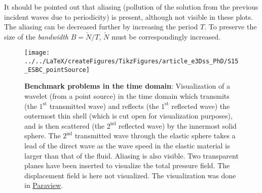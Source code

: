 It should be pointed out that aliasing (pollution of the solution from the previous incident waves due to periodicity) is present, although not visible in these plots. The aliasing can be decreased further by increasing the period $T$. To preserve the size of the \textit{bandwidth} $B=\check{N}/T$, $\check{N}$ must be correspondingly increased. 
\begin{figure}
	\centering
	\texttt{[image: ../../LaTeX/createFigures/TikzFigures/article\_e3Dss\_PhD/S15\_ESBC\_pointSource]}
    \caption{\textbf{Benchmark problems in the time domain}: Visualization of a wavelet (from a point source) in the time domain which transmits (the $1^{\mathrm{st}}$ transmitted wave) and reflects (the $1^{\mathrm{st}}$ reflected wave) the outermost thin shell (which is cut open for visualization purposes), and is then scattered (the $2^{\mathrm{nd}}$ reflected wave) by the innermost solid sphere. The $2^{\mathrm{nd}}$ transmitted wave through the elastic sphere takes a lead of the direct wave as the wave speed in the elastic material is larger than that of the fluid. Aliasing is also visible. Two transparent planes have been inserted to visualize the total pressure field. The displacement field is here not visualized. The visualization was done in \href{http://www.paraview.org/}{Paraview}.}
	\label{Fig1:S15_ESBC_pointCharge}
\end{figure}
